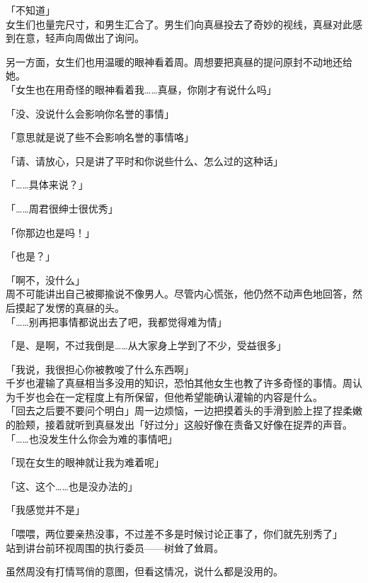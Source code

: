 「不知道」\\

女生们也量完尺寸，和男生汇合了。男生们向真昼投去了奇妙的视线，真昼对此感到在意，轻声向周做出了询问。

另一方面，女生们也用温暖的眼神看着周。周想要把真昼的提问原封不动地还给她。\\

「女生也在用奇怪的眼神看着我……真昼，你刚才有说什么吗」

「没、没说什么会影响你名誉的事情」

「意思就是说了些不会影响名誉的事情咯」

「请、请放心，只是讲了平时和你说些什么、怎么过的这种话」

「……具体来说？」

「……周君很绅士很优秀」

「你那边也是吗！」

「也是？」

「啊不，没什么」\\

周不可能讲出自己被揶揄说不像男人。尽管内心慌张，他仍然不动声色地回答，然后摸起了发愣的真昼的头。\\

「……别再把事情都说出去了吧，我都觉得难为情」

「是、是啊，不过我倒是……从大家身上学到了不少，受益很多」

「我说，我很担心你被教唆了什么东西啊」\\

千岁也灌输了真昼相当多没用的知识，恐怕其他女生也教了许多奇怪的事情。周认为千岁也会在一定程度上有所保留，但他希望能确认灌输的内容是什么。\\

「回去之后要不要问个明白」周一边烦恼，一边把摸着头的手滑到脸上捏了捏柔嫩的脸颊，接着就听到真昼发出「好过分」这般好像在责备又好像在捉弄的声音。\\

「……也没发生什么你会为难的事情吧」

「现在女生的眼神就让我为难着呢」

「这、这个……也是没办法的」

「我感觉并不是」

「喂喂，两位要亲热没事，不过差不多是时候讨论正事了，你们就先别秀了」\\

站到讲台前环视周围的执行委员——树耸了耸肩。

虽然周没有打情骂俏的意图，但看这情况，说什么都是没用的。\\


